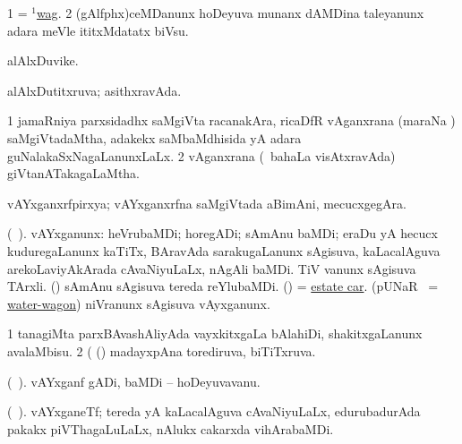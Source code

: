 \bentry
{} 
\gl{\sakirx}
\expl{}
\bmng
\bnum
\num{1} = \hyperlink{wag(1)}{$^1$wag}. 
\num{2} (gAlfphx)ceMDanunx hoDeyuva munanx dAMDina taleyanunx adara meVle ititxMdatatx biVsu. 
\enum
\emng
\eentry

\bentry
{} 
\gl{\nA}
\expl{}
\bmng
alAlxDuvike. 
\emng
\eentry

\bentry
{} 
\gl{\gu}
\expl{}
\bmng
alAlxDutitxruva; asithxravAda. 
\emng
\eentry

\bentry
{} 
\gl{\gu}
\expl{}
\bmng
\bnum
\num{1} jamaRniya parxsidadhx saMgiVta racanakAra, ricaDfR vAganxrana (maraNa ) saMgiVtadaMtha, adakekx saMbaMdhisida yA adara guNalakaSxNagaLanunxLaLx. 
\num{2} vAganxrana (\kanmu\ bahaLa visAtxravAda) giVtanATakagaLaMtha. 
\enum
\emng
\eentry

\bentry
{} 
\gl{\nA}
\expl{}
\bmng
vAYxganxrfpirxya; vAYxganxrfna saMgiVtada aBimAni, mecucxgegAra. 
\emng
\eentry

\bentry
{}
\gl{\nA}
\bmng
(\birx\ ). vAYxganunx: 
\banum
{} heVrubaMDi; horegADi; sAmAnu baMDi; eraDu yA hecucx kuduregaLanunx kaTiTx, BAravAda sarakugaLanunx sAgisuva, kaLacalAguva arekoLaviyAkArada cAvaNiyuLaLx, nAgAli baMDi. 
 TiV \mo vanunx sAgisuva TArxli. 
 (\birx) sAmAnu sAgisuva tereda reYlubaMDi. 
 (\AmA) = \hyperref{kandict_e.pdf}{E}{estate car}{estate car}. 
 (pUNaR \parx\ = \hyperlink{water-wagon}{water-wagon}) niVranunx sAgisuva vAyxganunx. 
\eanum
\emng

\noindent 
\gl{\pagu}
\expl{}
\bmng
\hypertarget{wagon(1)}{} 
\bnum
\num{1}  tanagiMta parxBAvashAliyAda vayxkitxgaLa bAlahiDi, shakitxgaLanunx avalaMbisu. 
\num{2}  (  (\ashi) madayxpAna torediruva, biTiTxruva. 
\enum
\emng
\eentry

\bentry
{} 
\gl{\nA}
\bmng
(\birx\ ). vAYxganf gADi, baMDi -- hoDeyuvavanu. 
\emng
\eentry

{} 
\gl{\nA}
\expl{}
\bmng
(\birx\ ). vAYxganeTf; tereda yA kaLacalAguva cAvaNiyuLaLx, edurubadurAda pakakx piVThagaLuLaLx, nAlukx cakarxda vihArabaMDi.  
\emng
\eentry


